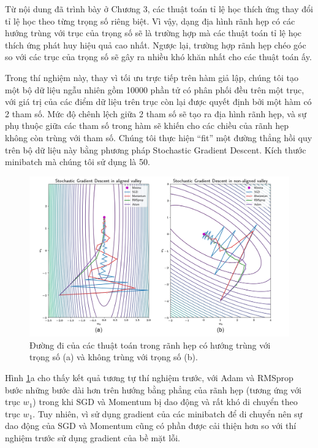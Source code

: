 Từ nội dung đã trình bày ở Chương 3, các thuật toán tỉ lệ học thích ứng thay đổi tỉ lệ học theo từng trọng số riêng biệt. Vì vậy, dạng địa hình rãnh hẹp có các hướng trùng với trục của trọng số sẽ là trường hợp mà các thuật toán tỉ lệ học thích ứng phát huy hiệu quả cao nhất. Ngược lại, trường hợp rãnh hẹp chéo góc so với các trục của trọng số sẽ gây ra nhiều khó khăn nhất cho các thuật toán ấy.

Trong thí nghiệm này, thay vì tối ưu trực tiếp trên hàm giả lập, chúng tôi tạo một bộ dữ liệu ngẫu nhiên gồm 10000 phần tử có phân phối đều trên một trục, với giá trị của các điểm dữ liệu trên trục còn lại được quyết định bởi một hàm có 2 tham số. Mức độ chênh lệch giữa 2 tham số sẽ tạo ra địa hình rãnh hẹp, và sự phụ thuộc giữa các tham số trong hàm sẽ khiến cho các chiều của rãnh hẹp không còn trùng với tham số. Chúng tôi thực hiện ``fit'' một đường thẳng hồi quy trên bộ dữ liệu này bằng phương pháp Stochastic Gradient Descent. Kích thước minibatch mà chúng tôi sử dụng là 50.

\begin{figure}[htp]
	\centering
	\includegraphics[width=140 mm]{images/aligned-nonaligned.png}
	\caption{Đường đi của các thuật toán trong rãnh hẹp có hướng trùng với trọng số (a) và không trùng với trọng số (b).}
	\label{fig:aligned-nonaligned}
\end{figure}

Hình \ref{fig:aligned-nonaligned}a cho thấy kết quả tương tự thí nghiệm trước, với Adam và RMSprop bước những bước dài hơn trên hướng bằng phẳng của rãnh hẹp (tương ứng với trục $w_1$) trong khi SGD và Momentum bị dao động và rất khó di chuyển theo trục $w_1$. Tuy nhiên, vì sử dụng gradient của các minibatch để di chuyển nên sự dao động của SGD và Momentum cũng có phần được cải thiện hơn so với thí nghiệm trước sử dụng gradient của bề mặt lỗi.

